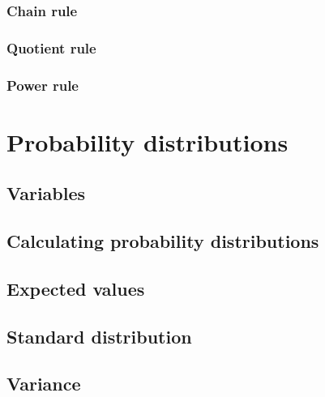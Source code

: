 \documentclass{book}
\begin{document}
\subsection{Chain rule}

\subsection{Quotient rule}

\subsection{Power rule}

\chapter{Probability distributions}
\section{Variables}

\section{Calculating probability distributions}

\section{Expected values}

\section{Standard distribution}

\section{Variance}
\end{document}
